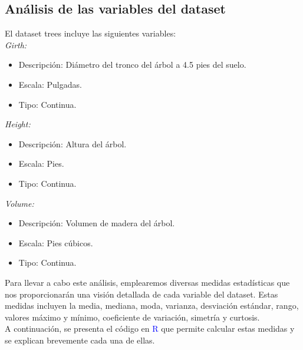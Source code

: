 \documentclass{article}
\begin{document}
\subsection{Análisis de las variables del dataset}
El dataset trees incluye las siguientes variables:\\
\emph{Girth:}
\begin{itemize}
    \item Descripción: Diámetro del tronco del árbol a 4.5 pies del suelo.
    \item Escala: Pulgadas.
    \item Tipo: Continua.
\end{itemize}
\emph{Height:}
\begin{itemize}
    \item Descripción: Altura del árbol.
    \item Escala: Pies.
    \item Tipo: Continua.
\end{itemize}
\emph{Volume:}
\begin{itemize}
    \item Descripción: Volumen de madera del árbol.
    \item Escala: Pies cúbicos.
    \item Tipo: Continua.
\end{itemize}
Para llevar a cabo este análisis, emplearemos diversas medidas estadísticas que nos proporcionarán una visión detallada de cada variable del dataset. Estas medidas incluyen la media, mediana, moda, varianza, desviación estándar, rango, valores máximo y mínimo, coeficiente de variación, simetría y curtosis.\\
A continuación, se presenta el código en \textcolor{blue}{R} que permite calcular estas medidas y se explican brevemente cada una de ellas.
\end{document}
